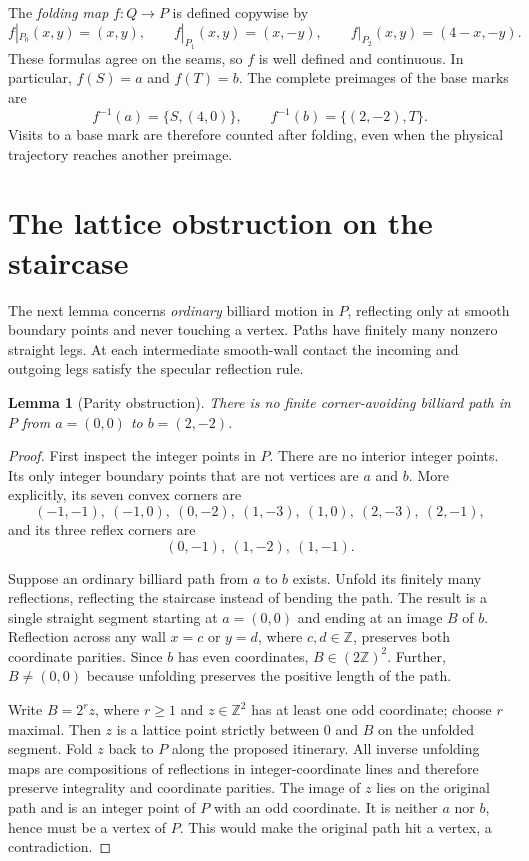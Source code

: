 \documentclass[11pt]{article}
\newtheorem{lemma}{Lemma}
\theoremstyle{remark}
\begin{document}
The \emph{folding map} $f:Q\to P$ is defined copywise by
\begin{equation}\label{eq:fold}
f|_{P_0}(x,y)=(x,y),\qquad
f|_{P_1}(x,y)=(x,-y),\qquad
f|_{P_2}(x,y)=(4-x,-y).
\end{equation}
These formulas agree on the seams, so $f$ is well defined and continuous. In particular, $f(S)=a$ and $f(T)=b$. The complete preimages of the base marks are
\[
 f^{-1}(a)=\{S,(4,0)\},\qquad f^{-1}(b)=\{(2,-2),T\}.
\]
Visits to a base mark are therefore counted after folding, even when the physical trajectory reaches another preimage.

\section{The lattice obstruction on the staircase}
The next lemma concerns \emph{ordinary} billiard motion in $P$, reflecting only at smooth boundary points and never touching a vertex. Paths have finitely many nonzero straight legs. At each intermediate smooth-wall contact the incoming and outgoing legs satisfy the specular reflection rule.

\begin{lemma}[Parity obstruction]\label{lem:parity}
There is no finite corner-avoiding billiard path in $P$ from $a=(0,0)$ to $b=(2,-2)$.
\end{lemma}
\begin{proof}
First inspect the integer points in $P$. There are no interior integer points. Its only integer boundary points that are not vertices are $a$ and $b$. More explicitly, its seven convex corners are
\[
(-1,-1),\ (-1,0),\ (0,-2),\ (1,-3),\ (1,0),\ (2,-3),\ (2,-1),
\]
and its three reflex corners are
\[
(0,-1),\ (1,-2),\ (1,-1).
\]

Suppose an ordinary billiard path from $a$ to $b$ exists. Unfold its finitely many reflections, reflecting the staircase instead of bending the path. The result is a single straight segment starting at $a=(0,0)$ and ending at an image $B$ of $b$. Reflection across any wall $x=c$ or $y=d$, where $c,d\in\mathbb{Z}$, preserves both coordinate parities. Since $b$ has even coordinates, $B\in(2\mathbb{Z})^2$. Further, $B\ne(0,0)$ because unfolding preserves the positive length of the path.

Write $B=2^r z$, where $r\ge 1$ and $z\in\mathbb{Z}^2$ has at least one odd coordinate; choose $r$ maximal. Then $z$ is a lattice point strictly between $0$ and $B$ on the unfolded segment. Fold $z$ back to $P$ along the proposed itinerary. All inverse unfolding maps are compositions of reflections in integer-coordinate lines and therefore preserve integrality and coordinate parities. The image of $z$ lies on the original path and is an integer point of $P$ with an odd coordinate. It is neither $a$ nor $b$, hence must be a vertex of $P$. This would make the original path hit a vertex, a contradiction.
\end{proof}
\end{document}
